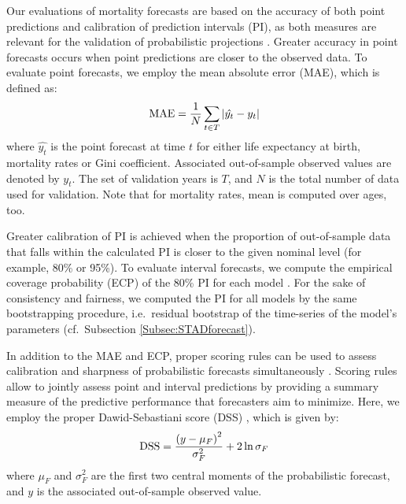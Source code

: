 \documentclass[11pt, a4paper]{article}
\begin{document}
Our evaluations of mortality forecasts are based on the accuracy of both point predictions and calibration of prediction intervals (PI), as both measures are relevant for the validation of probabilistic projections \citep{chatfield2000time}. Greater accuracy in point forecasts occurs when point predictions are closer to the observed data. To evaluate point forecasts, we employ the mean absolute error (MAE), which is defined as:
%
\begin{equation}\label{Eq:MAE}
	\mathrm{MAE} = \frac{1}{N} \sum_{t \in T} \left| \hat{y_t} - y_t \right|  \notag 
\end{equation}
% 
where $\hat{y_t}$ is the point forecast at time $t$ for either life expectancy at birth, mortality rates or Gini coefficient. Associated out-of-sample observed values are denoted by $y_t$. The set of validation years is $T$, and $N$ is the total number of data used for validation. Note that for mortality rates, mean is computed over ages, too. 

Greater calibration of PI is achieved when the proportion of out-of-sample data that falls within the calculated PI is closer to the given nominal level (for example, 80\% or 95\%). To evaluate interval forecasts, we compute the empirical coverage probability (ECP) of the 80\% PI for each model \cite[as in, for example,][]{shang2011point,raftery2013bayesian}. For the sake of consistency and fairness, we computed the PI for all models by the same bootstrapping procedure, i.e.~residual bootstrap of the time-series of the model's parameters (cf.~Subsection \ref{Subsec:STADforecast}).

{\color{red}In addition to the MAE and ECP, proper scoring rules can be used to assess calibration and sharpness of probabilistic forecasts simultaneously \cite[for a review, see][]{gneiting2014probabilistic}. Scoring rules allow to jointly assess point and interval predictions by providing a summary measure of the predictive performance that forecasters aim to minimize. Here, we employ the proper Dawid-Sebastiani score (DSS) \citep{dawid1999coherent}, which is given by:
%
\begin{equation}\label{Eq:DSS}
\mathrm{DSS} = \frac{\left(y-\mu_F\right)^2}{\sigma^2_F} + 2 \ln \sigma_F  \notag 
\end{equation}
%
where $\mu_F$ and $\sigma^2_F$ are the first two central moments of the probabilistic forecast, and $y$ is the associated out-of-sample observed value.
}
\end{document}
